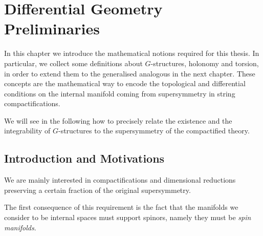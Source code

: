 \documentclass[debug]{phd}
\begin{document}
	\chapter{Differential Geometry Preliminaries}
	\label{chap1}

		In this chapter we introduce the mathematical notions required for this thesis. 
		In particular, we collect some definitions about $G$-structures, holonomy and torsion, in order to extend them to the generalised analogous in the next chapter.
		These concepts are the mathematical way to encode the topological and differential conditions on the internal manifold coming from supersymmetry in string compactifications. 
		
		We will see in the following how to precisely relate the existence and the integrability of $G$-structures to the supersymmetry of the compactified theory.
		
		\section{Introduction and Motivations}
				We are mainly interested in compactifications and dimensional reductions preserving a certain fraction of the original supersymmetry.
				
				The first consequence of this requirement is the fact that the manifolds we consider to be internal spaces must support spinors, namely they must be \emph{spin manifolds}.
				
\end{document}
